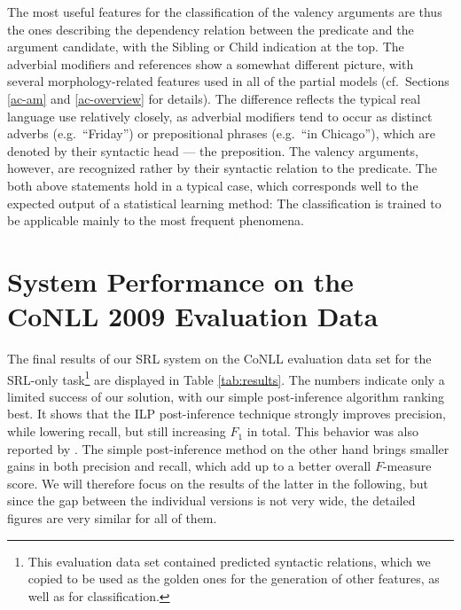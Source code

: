 \documentclass[12pt,notitlepage,a4paper]{report}
\begin{document}
The most useful features for the classification of the valency arguments are thus the ones describing the dependency relation between the predicate and the argument candidate, with the Sibling or Child indication at the top. The adverbial modifiers and references show a somewhat different picture, with several morphology-related features used in all of the partial models (cf.\ Sections \ref{ac-am} and \ref{ac-overview} for details). The difference reflects the typical real language use relatively closely, as adverbial modifiers tend to occur as distinct adverbs (e.g.\ ``Friday'') or prepositional phrases (e.g.\ ``in Chicago''), which are denoted by their syntactic head --- the preposition. The valency arguments, however, are recognized rather by their syntactic relation to the predicate. The both above statements hold in a typical case, which corresponds well to the expected output of a statistical learning method: The classification is trained to be applicable mainly to the most frequent phenomena.

\section{System Performance on the CoNLL 2009 Evaluation Data}\label{performance}

The final results of our SRL system on the CoNLL evaluation data set for the SRL-only task\footnote{This evaluation data set contained predicted syntactic relations, which we copied to be used as the golden ones for the generation of other features, as well as for classification.} are displayed in Table \ref{tab:results}. The numbers indicate only a limited success of our solution, with our simple post-inference algorithm ranking best. It shows that the ILP post-inference technique strongly improves precision, while lowering recall, but still increasing $F_1$ in total. This behavior was also reported by \citet{che09}. The simple post-inference method on the other hand brings smaller gains in both precision and recall, which add up to a better overall $F$\mbox{-}measure score. We will therefore focus on the results of the latter in the following, but since the gap between the individual versions is not very wide, the detailed figures are very similar for all of them.
\end{document}
